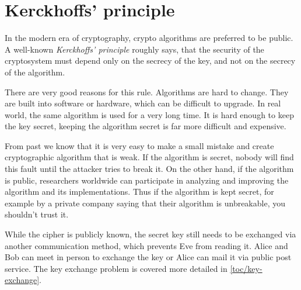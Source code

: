 \section{Kerckhoffs' principle}
\label{toc/kerckhoffs-principle}

In the modern era of cryptography, crypto algorithms are preferred to be public. A well-known \textit{Kerckhoffs' principle} roughly says, that the security of the cryptosystem must depend only on the secrecy of the key, and not on the secrecy of the algorithm.

There are very good reasons for this rule. Algorithms are hard to change. They are built into software or hardware, which can be difficult to upgrade. In real world, the same algorithm is used for a very long time. It is hard enough to keep the key secret, keeping the algorithm secret is far more difficult and expensive.

From past we know that it is very easy to make a small mistake and create cryptographic algorithm that is weak. If the algorithm is secret, nobody will find this fault until the attacker tries to break it. On the other hand, if the algorithm is public, researchers worldwide can participate in analyzing and improving the algorithm and its implementations. Thus if the algorithm is kept secret, for example by a private company saying that their algorithm is unbreakable, you shouldn't trust it.

While the cipher is publicly known, the secret key still needs to be exchanged via another communication method, which prevents Eve from reading it. Alice and Bob can meet in person to exchange the key or Alice can mail it via public post service. The key exchange problem is covered more detailed in \autoref{toc/key-exchange}.
